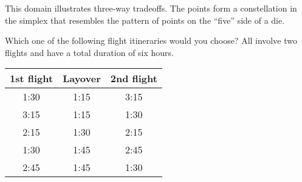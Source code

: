 
This domain illustrates three-way tradeoffs.
The points form a constellation in the simplex that resembles the pattern of points on the ``five'' side of a die.

\begin{tcolorbox}
Which one of the following flight itineraries would you choose? All involve two
flights and have a total duration of six hours.

\begin{tabular}{ccc}
\hline
	1st flight & Layover & 2nd flight \\ \hline
	1:30 & 1:15 & 3:15 \\ 
	3:15 & 1:15 & 1:30 \\ 
	2:15 & 1:30 & 2:15 \\ 
	1:30 & 1:45 & 2:45 \\ 
	2:45 & 1:45 & 1:30 \\ \hline
\end{tabular}
\end{tcolorbox}
